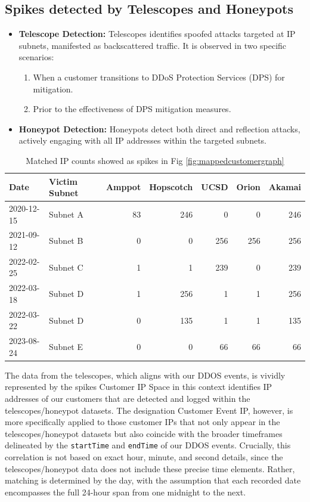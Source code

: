\subsection{Spikes detected by Telescopes and Honeypots}
\begin{itemize}
    \item \textbf{Telescope Detection:} Telescopes identifies spoofed attacks targeted at IP subnets, manifested as backscattered traffic. It is observed in two specific scenarios: 
    \begin{enumerate}
        \item When a customer transitions to DDoS Protection Services (DPS) for mitigation.
        \item Prior to the effectiveness of DPS mitigation measures.
    \end{enumerate}
    
    \item \textbf{Honeypot Detection:} Honeypots detect both direct and reflection attacks, actively engaging with all IP addresses within the targeted subnets.
\end{itemize}

\begin{table}[htbp]
    \centering
    \caption{Matched IP counts showed as spikes in Fig \ref{fig:mappedcustomergraph}}
    \begin{tabular}{|l|l|r|r|r|r|r|}
    \hline
    \textbf{Date} & \textbf{Victim Subnet} & \textbf{Amppot} & \textbf{Hopscotch} & \textbf{UCSD} & \textbf{Orion} & \textbf{Akamai} \\
    \hline
    2020-12-15 & Subnet A & 83 & 246 & 0 & 0 & 246 \\
    2021-09-12 & Subnet B & 0 & 0 & 256 & 256 & 256 \\
    2022-02-25 & Subnet C & 1 & 1 & 239 & 0 & 239 \\
    2022-03-18 & Subnet D & 1 & 256 & 1 & 1 & 256 \\
    2022-03-22 & Subnet D & 0 & 135 & 1 & 1 & 135 \\
    2023-08-24 & Subnet E & 0 & 0 & 66 & 66 & 66 \\
    \hline
    \end{tabular}
    \label{table:splits_data}
    \end{table}


The data from the telescopes, which aligns with our DDOS events, is vividly represented by the spikes 
Customer IP Space in this context identifies IP addresses of our customers that are detected and logged within the telescopes/honeypot datasets. The designation Customer Event IP, however, is more specifically applied to those customer IPs that not only appear in the telescopes/honeypot datasets but also coincide with the broader timeframes delineated by the \texttt{startTime} and \texttt{endTime} of our DDOS events. Crucially, this correlation is not based on exact hour, minute, and second details, since the telescopes/honeypot data does not include these precise time elements. Rather, matching is determined by the day, with the assumption that each recorded date encompasses the full 24-hour span from one midnight to the next.
